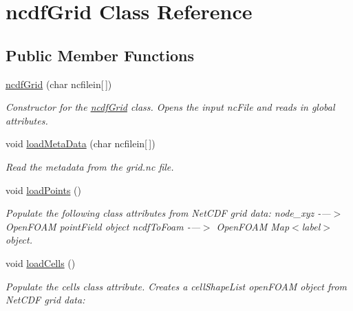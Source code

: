 \hypertarget{classncdfGrid}{}\section{ncdf\+Grid Class Reference}
\label{classncdfGrid}
\subsection*{Public Member Functions}
\begin{DoxyCompactItemize}
\item 
\mbox{\hyperlink{classncdfGrid_a4b9acf50933fce83cce51b4a5fdd8e38}{ncdf\+Grid}} (char ncfilein\mbox{[}$\,$\mbox{]})
\begin{DoxyCompactList}\small\item\em Constructor for the \mbox{\hyperlink{classncdfGrid}{ncdf\+Grid}} class. Opens the input nc\+File and reads in global attributes. \end{DoxyCompactList}\item 
void \mbox{\hyperlink{classncdfGrid_ac436b49a9278c5828469794b6b6e0730}{load\+Meta\+Data}} (char ncfilein\mbox{[}$\,$\mbox{]})
\begin{DoxyCompactList}\small\item\em Read the metadata from the grid.\+nc file. \end{DoxyCompactList}\item 
\mbox{\label{classncdfGrid_ac26434f84b6f27486aa330b123c3b398}} 
void \mbox{\hyperlink{classncdfGrid_ac26434f84b6f27486aa330b123c3b398}{load\+Points}} ()
\begin{DoxyCompactList}\small\item\em Populate the following class attributes from Net\+C\+DF grid data\+: node\+\_\+xyz -\/---$>$ Open\+F\+O\+AM point\+Field object ncdf\+To\+Foam -\/---$>$ Open\+F\+O\+AM Map$<$label$>$ object. \end{DoxyCompactList}\item 
\mbox{\label{classncdfGrid_a1b354370ae07160bddfe3ad96cc065f0}} 
void \mbox{\hyperlink{classncdfGrid_a1b354370ae07160bddfe3ad96cc065f0}{load\+Cells}} ()
\begin{DoxyCompactList}\small\item\em Populate the cells class attribute. Creates a cell\+Shape\+List open\+F\+O\+AM object from Net\+C\+DF grid data\+: \end{DoxyCompactList}\item 

\end{DoxyCompactItemize}
